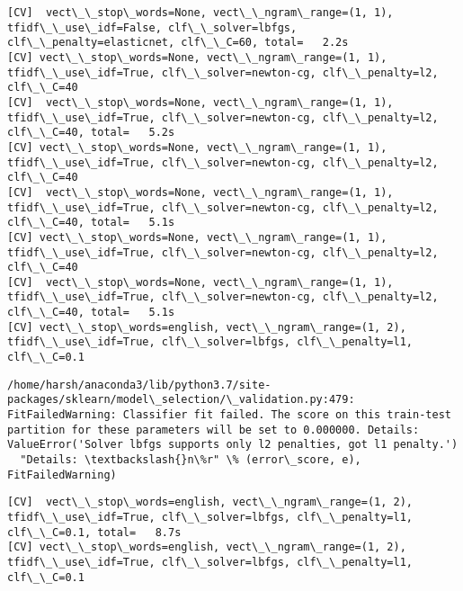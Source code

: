 \documentclass[11pt]{article}
\begin{document}
    \begin{Verbatim}[commandchars=\\\{\}]
[CV]  vect\_\_stop\_words=None, vect\_\_ngram\_range=(1, 1), tfidf\_\_use\_idf=False, clf\_\_solver=lbfgs, clf\_\_penalty=elasticnet, clf\_\_C=60, total=   2.2s
[CV] vect\_\_stop\_words=None, vect\_\_ngram\_range=(1, 1), tfidf\_\_use\_idf=True, clf\_\_solver=newton-cg, clf\_\_penalty=l2, clf\_\_C=40 
[CV]  vect\_\_stop\_words=None, vect\_\_ngram\_range=(1, 1), tfidf\_\_use\_idf=True, clf\_\_solver=newton-cg, clf\_\_penalty=l2, clf\_\_C=40, total=   5.2s
[CV] vect\_\_stop\_words=None, vect\_\_ngram\_range=(1, 1), tfidf\_\_use\_idf=True, clf\_\_solver=newton-cg, clf\_\_penalty=l2, clf\_\_C=40 
[CV]  vect\_\_stop\_words=None, vect\_\_ngram\_range=(1, 1), tfidf\_\_use\_idf=True, clf\_\_solver=newton-cg, clf\_\_penalty=l2, clf\_\_C=40, total=   5.1s
[CV] vect\_\_stop\_words=None, vect\_\_ngram\_range=(1, 1), tfidf\_\_use\_idf=True, clf\_\_solver=newton-cg, clf\_\_penalty=l2, clf\_\_C=40 
[CV]  vect\_\_stop\_words=None, vect\_\_ngram\_range=(1, 1), tfidf\_\_use\_idf=True, clf\_\_solver=newton-cg, clf\_\_penalty=l2, clf\_\_C=40, total=   5.1s
[CV] vect\_\_stop\_words=english, vect\_\_ngram\_range=(1, 2), tfidf\_\_use\_idf=True, clf\_\_solver=lbfgs, clf\_\_penalty=l1, clf\_\_C=0.1 

    \end{Verbatim}

    \begin{Verbatim}[commandchars=\\\{\}]
/home/harsh/anaconda3/lib/python3.7/site-packages/sklearn/model\_selection/\_validation.py:479: FitFailedWarning: Classifier fit failed. The score on this train-test partition for these parameters will be set to 0.000000. Details: 
ValueError('Solver lbfgs supports only l2 penalties, got l1 penalty.')
  "Details: \textbackslash{}n\%r" \% (error\_score, e), FitFailedWarning)

    \end{Verbatim}

    \begin{Verbatim}[commandchars=\\\{\}]
[CV]  vect\_\_stop\_words=english, vect\_\_ngram\_range=(1, 2), tfidf\_\_use\_idf=True, clf\_\_solver=lbfgs, clf\_\_penalty=l1, clf\_\_C=0.1, total=   8.7s
[CV] vect\_\_stop\_words=english, vect\_\_ngram\_range=(1, 2), tfidf\_\_use\_idf=True, clf\_\_solver=lbfgs, clf\_\_penalty=l1, clf\_\_C=0.1 

    \end{Verbatim}
\end{document}
